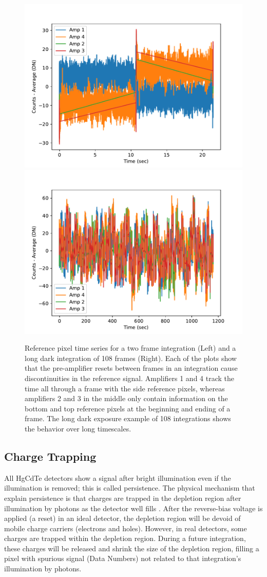 \documentclass{aastex62}
\begin{document}
\begin{figure}[!hbtp]
\centering
\includegraphics[width=.49\columnwidth]{allamps.pdf}
\includegraphics[width=.49\columnwidth]{allamps_long_dark.pdf}
\caption{Reference pixel time series for a two frame integration (Left) and a long dark integration of 108 frames (Right). Each of the plots show that the pre-amplifier resets between frames in an integration cause discontinuities in the reference signal. Amplifiers 1 and 4 track the time all through a frame with the side reference pixels, whereas amplifiers 2 and 3 in the middle only contain information on the bottom and top reference pixels at the beginning and ending of a frame.
The long dark exposure example of 108 integrations shows the behavior over long timescales.}\label{fig:ampResetDark}
\end{figure}

\subsection{Charge Trapping}
All HgCdTe detectors show a signal after bright illumination even if the illumination is removed; this is called persistence.
The physical mechanism that explain persistence is that charges are trapped in the depletion region after illumination by photons as the detector well fills \citep{smith2008imgPersistence,leisenring2016persistence}.
After the reverse-bias voltage is applied (a reset) in an ideal detector, the depletion region will be devoid of mobile charge carriers (electrons and holes).
However, in real detectors, some charges are trapped within the depletion region.
During a future integration, these charges will be released and shrink the size of the depletion region, filling a pixel with spurious signal (Data Numbers) not related to that integration's illumination by photons.
\end{document}
